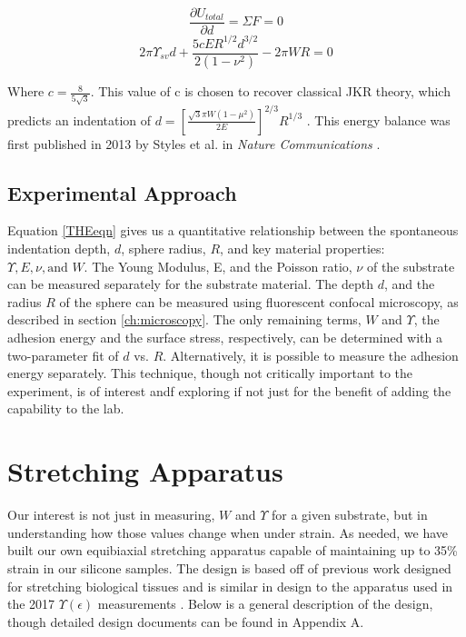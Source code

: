 \begin{equation*}
\frac{\partial U_{total}}{\partial d} = \Sigma F = 0
\end{equation*}
\begin{equation}
\label{THEeqn}
2 \pi \Upsilon_{sv}d  + \frac{5cER^{1/2}d^{3/2}}{2 \left( 1-\nu ^2 \right) }  - 2 \pi WR = 0
\end{equation}

Where $ c = \frac{8}{5\sqrt{3}} $. This value of c is chosen to recover classical JKR theory, which predicts an indentation of $ d =  \left[\frac{\sqrt{3}\pi W (1 - \mu^2)}{2E} \right]^{2/3}R^{1/3}$ \cite{style2013surface, johnson1971surface}. This energy balance was first published in 2013 by Styles et al. in \textit{Nature Communications} \cite{style2013surface}. 


\subsection{Experimental Approach}
Equation \ref{THEeqn} gives us a quantitative relationship between the spontaneous indentation depth, $ d $, sphere radius, $ R $, and key material properties: $ \Upsilon, E, \nu, \text{and }W $. The Young Modulus, E, and the Poisson ratio, $\nu$ of the substrate can be measured separately for the substrate material. The depth $d$, and the radius $R$ of the sphere can be measured using fluorescent confocal microscopy, as described in section \ref{ch:microscopy}. The only remaining terms, $W$ and $\Upsilon$, the adhesion energy and the surface stress, respectively, can be determined with a two-parameter fit of $ d $ vs. $ R. $ Alternatively, it is possible to measure the adhesion energy separately. This technique, though not critically important to the experiment, is of interest andf exploring if not just for the benefit of adding the capability to the lab.   

\section{Stretching Apparatus}
Our interest is not just in  measuring, $W$ and $\Upsilon$ for a given substrate, but in understanding how those values change when under strain. As needed, we have built our own equibiaxial stretching apparatus capable of maintaining up to 35\% strain in our silicone samples. The design is based off of previous work designed for stretching biological tissues \cite{na2008time} and is similar in design to the apparatus used in the 2017 $\Upsilon(\epsilon)$ measurements \cite{xu2017direct}. Below is a general description of the design, though detailed design documents can be found in Appendix A.

